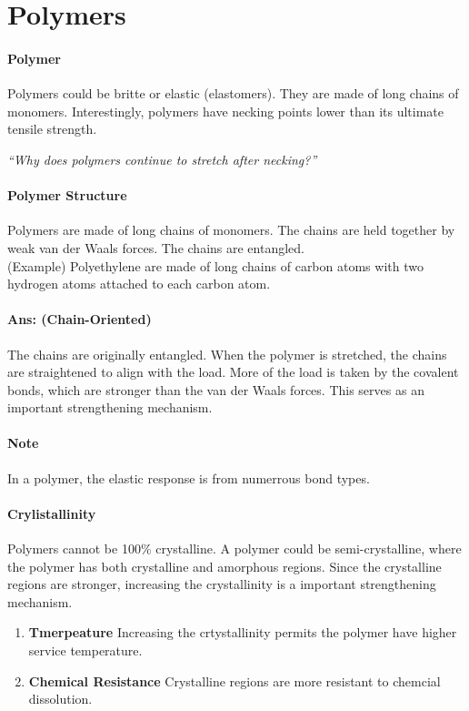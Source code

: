 \documentclass[11pt]{report}
\begin{document}
\section{Polymers} 
\paragraph{Polymer} Polymers could be britte or elastic (elastomers). They are made of long chains of monomers. Interestingly, polymers have necking points lower than its ultimate tensile strength.
\begin{center}
    \textit{``Why does polymers continue to stretch after necking?''}
\end{center}
\paragraph{Polymer Structure} Polymers are made of long chains of monomers. The chains are held together by weak van der Waals forces. The chains are entangled.
\\ (Example) Polyethylene are made of long chains of carbon atoms with two hydrogen atoms attached to each carbon atom.
\paragraph{Ans: (Chain-Oriented)} The chains are originally entangled. When the polymer is stretched, the chains are straightened to align with the load. More of the load is taken by the covalent bonds, which are stronger than the van der Waals forces. This serves as an important strengthening mechanism.
\paragraph{Note} In a polymer, the elastic response is from numerrous bond types.
\paragraph{Crylistallinity} Polymers cannot be 100\% crystalline. A polymer could be semi-crystalline, where the polymer has both crystalline and amorphous regions. Since the crystalline regions are stronger, increasing the crystallinity is a important strengthening mechanism.
\begin{enumerate}
    \item \textbf{Tmerpeature} Increasing the crtystallinity permits the polymer have higher service temperature. 
    \item \textbf{Chemical Resistance} Crystalline regions are more resistant to chemcial dissolution.
\end{enumerate}
\end{document}
